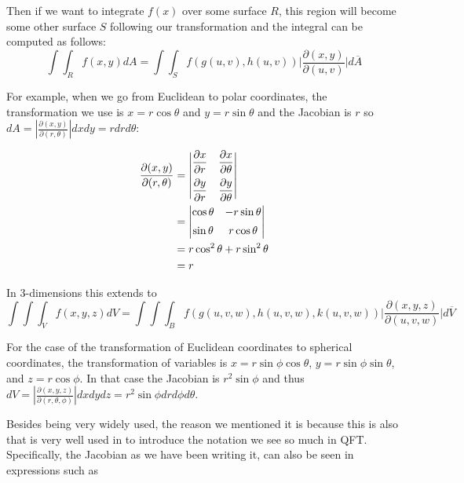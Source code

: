 Then if we want to integrate $f(x)$ over some surface $R$, this region will become some other surface $S$
following our transformation and the integral can be computed as follows:
$$
\int \int_{R} f(x,y) dA
= \int \int_{S} f\left( g(u,v), h(u,v) \right) \Biggl| \frac{ \partial (x,y) }{ \partial (u,v) } \Biggl| d\overline{A}
$$

For example, when we go from Euclidean to polar coordinates, the transformation we use is $x = r\cos\theta$
and $y = r\sin\theta$ and the Jacobian is $r$ so
$dA = \left| \frac{\partial (x, y)}{\partial (r, \theta)} \right| dx dy = r dr d\theta$:

\begin{align*}
\frac{\partial (x, y)}{\partial (r, \theta)} &= 
\begin{vmatrix}
    \dfrac{ \partial x }{ \partial r } & \dfrac{ \partial x }{ \partial \theta } \\ \addlinespace
    \dfrac{ \partial y }{ \partial r } & \dfrac{ \partial y }{ \partial \theta }
\end{vmatrix} \\
& = \begin{vmatrix}
    \cos\theta & -r\sin\theta \\ \addlinespace
    \sin\theta & r\cos\theta
\end{vmatrix} \\
&= r \cos^2 \theta + r \sin^2 \theta \\
&= r
\end{align*}



In 3-dimensions this extends to
$$
\int \int \int_{V} f(x,y,z) dV
= \int \int \int_{B} f\left( g(u,v,w), h(u,v,w), k(u,v,w) \right) \Biggl| \frac{ \partial (x,y,z) }{ \partial (u,v,w) } \Biggl| d\overline{V}
$$

For the case of the transformation of Euclidean coordinates to spherical coordinates, the transformation of variables is
$x = r \sin\phi \cos\theta $, $y = r \sin\phi \sin\theta$, and $z = r\cos\phi$.
In that case the Jacobian is $r^2 \sin\phi$ and thus
$dV = \left| \frac{\partial (x, y, z)}{\partial (r, \theta, \phi)} \right| dx dy dz = r^2 \sin\phi dr d\phi d\theta$.


Besides being very widely used, the reason we mentioned it is because this is also that is very well used in
\cite{gifted-qft} to introduce the notation we see so much in QFT.
Specifically, the Jacobian as we have been writing it, can also be seen in expressions such as


